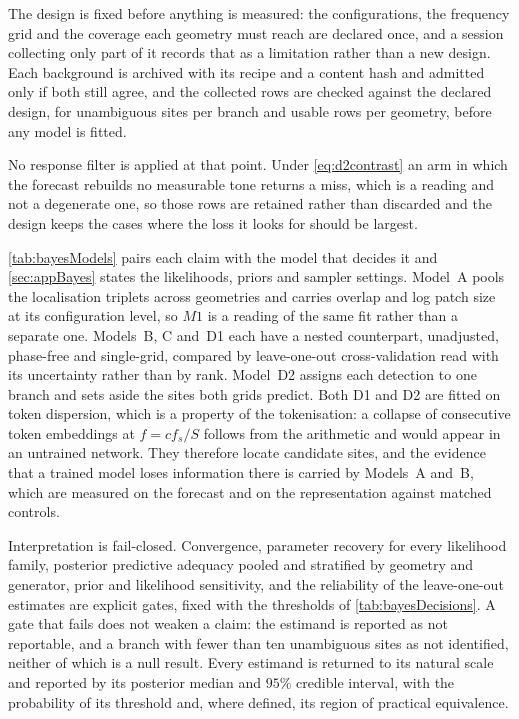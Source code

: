 The design is fixed before anything is measured: the configurations, the frequency grid and the coverage each geometry must reach are declared once, and a session collecting only part of it records that as a limitation rather than a new design. Each background is archived with its recipe and a content hash and admitted only if both still agree, and the collected rows are checked against the declared design, for unambiguous sites per branch and usable rows per geometry, before any model is fitted.

No response filter is applied at that point. Under \autoref{eq:d2contrast} an arm in which the forecast rebuilds no measurable tone returns a miss, which is a reading and not a degenerate one, so those rows are retained rather than discarded and the design keeps the cases where the loss it looks for should be largest.

\autoref{tab:bayesModels} pairs each claim with the model that decides it and \autoref{sec:appBayes} states the likelihoods, priors and sampler settings. Model~A pools the localisation triplets across geometries and carries overlap and log patch size at its configuration level, so $M1$ is a reading of the same fit rather than a separate one. Models~B, C and~D1 each have a nested counterpart, unadjusted, phase-free and single-grid, compared by leave-one-out cross-validation read with its uncertainty rather than by rank. Model~D2 assigns each detection to one branch and sets aside the sites both grids predict. Both D1 and D2 are fitted on token dispersion, which is a property of the tokenisation: a collapse of consecutive token embeddings at $f=c f_s/S$ follows from the arithmetic and would appear in an untrained network. They therefore locate candidate sites, and the evidence that a trained model loses information there is carried by Models~A and~B, which are measured on the forecast and on the representation against matched controls.

Interpretation is fail-closed. Convergence, parameter recovery for every likelihood family, posterior predictive adequacy pooled and stratified by geometry and generator, prior and likelihood sensitivity, and the reliability of the leave-one-out estimates are explicit gates, fixed with the thresholds of \autoref{tab:bayesDecisions}. A gate that fails does not weaken a claim: the estimand is reported as not reportable, and a branch with fewer than ten unambiguous sites as not identified, neither of which is a null result. Every estimand is returned to its natural scale and reported by its posterior median and $95\%$ credible interval, with the probability of its threshold and, where defined, its region of practical equivalence.
